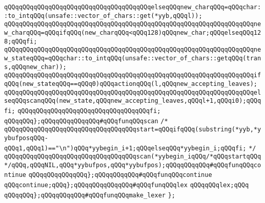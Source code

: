 \verb|qQQqqQQqqQQqqQQqqQQqqQQqqQQqqQQqqQQqqQQqelseqQQqnew_charqQQq=qQQqchar::to_intqQQq(unsafe::vector_of_chars::get(*yyb,qQQql));|\newline
\verb|qQQqqQQqqQQqqQQqqQQqqQQqqQQqqQQqqQQqqQQqqQQqqQQqqQQqqQQqqQQqqQQqqQQqnew_charqQQq=qQQqifqQQq(new_charqQQq<qQQq128)qQQqnew_char;qQQqelseqQQq128;qQQqfi;|\newline
\verb|qQQqqQQqqQQqqQQqqQQqqQQqqQQqqQQqqQQqqQQqqQQqqQQqqQQqqQQqqQQqqQQqqQQqnew_stateqQQq=qQQqchar::to_intqQQq(unsafe::vector_of_chars::getqQQq(trans,qQQqnew_char));|\newline
\verb|qQQqqQQqqQQqqQQqqQQqqQQqqQQqqQQqqQQqqQQqqQQqqQQqqQQqqQQqqQQqqQQqqQQqifqQQq(new_stateqQQq==qQQq0)qQQqactionqQQq(l,qQQqnew_accepting_leaves);|\newline
\verb|qQQqqQQqqQQqqQQqqQQqqQQqqQQqqQQqqQQqqQQqqQQqqQQqqQQqqQQqqQQqqQQqqQQqelseqQQqscanqQQq(new_state,qQQqnew_accepting_leaves,qQQql+1,qQQqi0);qQQqfi;|\newline
\verb|qQQqqQQqqQQqqQQqqQQqqQQqqQQqqQQqqQQqfi;|\newline
\verb|qQQqqQQq};qQQqqQQqqQQqqQQq#qQQqfunqQQqscan|\newline
\verb|/*|\newline
\verb|qQQqqQQqqQQqqQQqqQQqqQQqqQQqqQQqqQQqstart=qQQqifqQQq(substring(*yyb,*yybufposqQQq-qQQq1,qQQq1)=="\n")qQQq*yybegin_i+1;qQQqelseqQQq*yybegin_i;qQQqfi;|\newline
\verb|*/|\newline
\verb|qQQqqQQqqQQqqQQqqQQqqQQqqQQqqQQqqQQqscan(*yybegin_iqQQq/*qQQqstartqQQq*/qQQq,qQQqNIL,qQQq*yybufpos,qQQq*yybufpos);qQQqqQQqqQQq#qQQqfunqQQqcontinue|\newline
\verb|qQQqqQQqqQQqqQQq};qQQqqQQqqQQq#qQQqfunqQQqcontinue|\newline
\verb|qQQqcontinue;qQQq};qQQqqQQqqQQqqQQq#qQQqfunqQQqlex|\newline
\verb|qQQqqQQqlex;qQQq|\newline
\verb|qQQqqQQq};qQQqqQQqqQQq#qQQqfunqQQqmake_lexer|\newline
\verb|};|\newline

